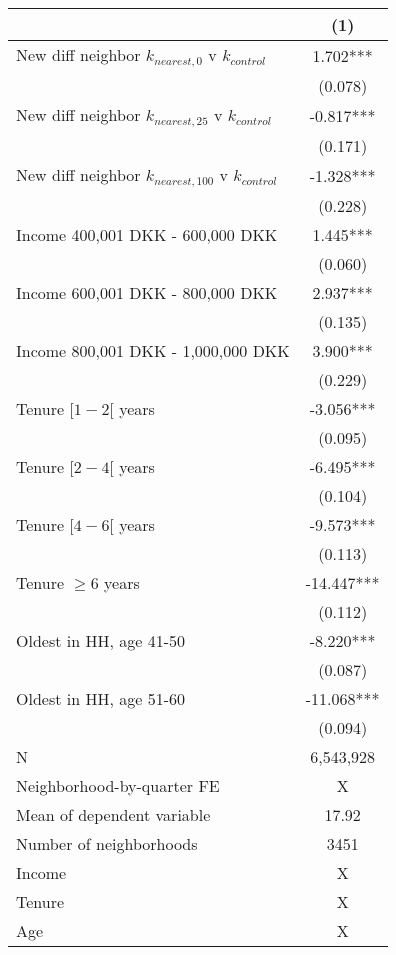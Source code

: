\begin{tabular}{lc}
\toprule
  & (1) \\ 
\midrule
New diff neighbor $k_{nearest,0}$ v $k_{control}$ & 1.702*** \\ 
 & (0.078) \\ 
New diff neighbor $k_{nearest,25}$ v $k_{control}$ & -0.817*** \\ 
 & (0.171) \\ 
New diff neighbor $k_{nearest,100}$ v $k_{control}$ & -1.328*** \\ 
 & (0.228) \\ 
Income 400,001 DKK - 600,000 DKK & 1.445*** \\ 
 & (0.060) \\ 
Income 600,001 DKK - 800,000 DKK & 2.937*** \\ 
 & (0.135) \\ 
Income 800,001 DKK - 1,000,000 DKK & 3.900*** \\ 
 & (0.229) \\ 
Tenure $[1-2[$ years & -3.056*** \\ 
 & (0.095) \\ 
Tenure $[2-4[$ years & -6.495*** \\ 
 & (0.104) \\ 
Tenure $[4-6[$ years & -9.573*** \\ 
 & (0.113) \\ 
Tenure $\geq 6$ years & -14.447*** \\ 
 & (0.112) \\ 
Oldest in HH, age 41-50 & -8.220*** \\ 
 & (0.087) \\ 
Oldest in HH, age 51-60 & -11.068*** \\ 
 & (0.094) \\ 
\midrule
N & 6,543,928 \\ 
Neighborhood-by-quarter FE & X \\ 
Mean of dependent variable & 17.92 \\ 
Number of neighborhoods & 3451 \\ 
Income & X \\ 
Tenure & X \\ 
Age & X \\ 
\bottomrule
\end{tabular}